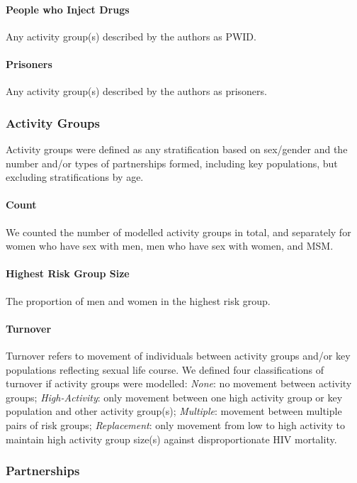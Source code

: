 \paragraph{People who Inject Drugs}
Any activity group(s) described by the authors as PWID.
\paragraph{Prisoners}
Any activity group(s) described by the authors as prisoners.
\subsubsection{Activity Groups}\label{app.sr.defs.act}
Activity groups were defined as any stratification based on
sex/gender and the number and/or types of partnerships formed, including key populations,
but excluding stratifications by age.
\paragraph{Count}
We counted the number of modelled activity groups in total,
and separately for women who have sex with men, men who have sex with women, and MSM.
\paragraph{Highest Risk Group Size}
The proportion of men and women in the highest risk group.
\paragraph{Turnover}
Turnover refers to movement of individuals between
activity groups and/or key populations reflecting sexual life course.
We defined four classifications of turnover if activity groups were modelled:
\emph{None}: no movement between activity groups;
\emph{High-Activity}: only movement between one high activity group or key population
and other activity group(s);
\emph{Multiple}: movement between multiple pairs of risk groups;
\emph{Replacement}: only movement from low to high activity
to maintain high activity group size(s) against disproportionate HIV mortality.
\subsubsection{Partnerships}\label{app.sr.defs.pt}
